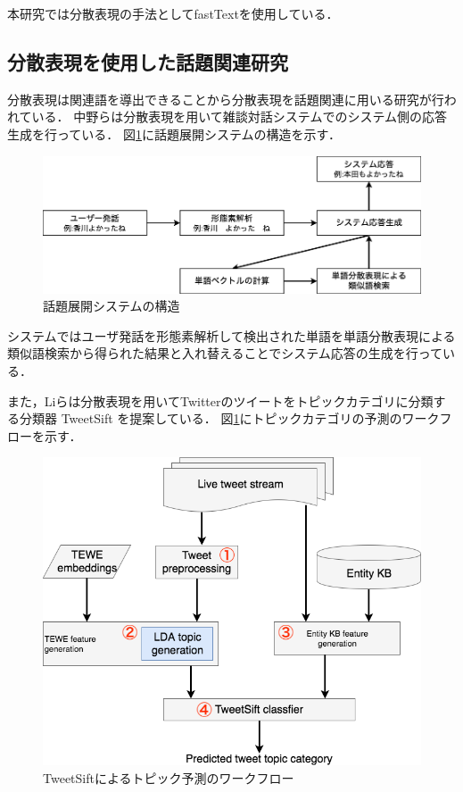 本研究では分散表現の手法としてfastTextを使用している．
\subsection{分散表現を使用した話題関連研究}
分散表現は関連語を導出できることから分散表現を話題関連に用いる研究が行われている．
中野ら\cite{embedTopic1}は分散表現を用いて雑談対話システムでのシステム側の応答生成を行っている．
図\ref{Fig:embedTopic1}に話題展開システムの構造を示す．
\begin{figure}[htbp]
 \begin{center}
  \includegraphics[width=\textwidth]{../images/2.Related_Work/embedTopic1.png}
  \caption{話題展開システムの構造}
  \label{Fig:embedTopic1}
  \vspace{-10pt}
 \end{center}
\end{figure}

システムではユーザ発話を形態素解析して検出された単語を単語分散表現による類似語検索から得られた結果と入れ替えることでシステム応答の生成を行っている．

また，Liら\cite{embedTopic2}は分散表現を用いてTwitterのツイートをトピックカテゴリに分類する分類器 TweetSift を提案している．
図\ref{Fig:embedTopic1}にトピックカテゴリの予測のワークフローを示す．
\begin{figure}[htbp]
 \begin{center}
  \includegraphics[width=\textwidth]{../images/2.Related_Work/TweetSift2.png}
  \caption{TweetSiftによるトピック予測のワークフロー}
  \label{Fig:tweetSift}
  \vspace{-10pt}
 \end{center}
\end{figure}

